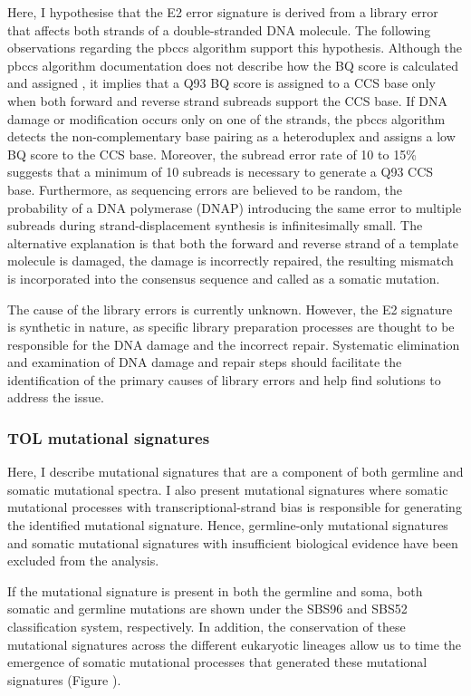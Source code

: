 Here, I hypothesise that the E2 error signature is derived from a library error that affects both strands of a double-stranded DNA molecule. The following observations regarding the pbccs algorithm support this hypothesis. Although the pbccs algorithm documentation does not describe how the BQ score is calculated and assigned \cite{ccs2023}, it implies that a Q93 BQ score is assigned to a CCS base only when both forward and reverse strand subreads support the CCS base. If DNA damage or modification occurs only on one of the strands, the pbccs algorithm detects the non-complementary base pairing as a heteroduplex and assigns a low BQ score to the CCS base. Moreover, the subread error rate of 10 to 15\% \cite{Chaisson2012-vr} suggests that a minimum of 10 subreads is necessary to generate a Q93 CCS base. Furthermore, as sequencing errors are believed to be random, the probability of a DNA polymerase (DNAP) introducing the same error to multiple subreads during strand-displacement synthesis is infinitesimally small. The alternative explanation is that both the forward and reverse strand of a template molecule is damaged, the damage is incorrectly repaired, the resulting mismatch is incorporated into the consensus sequence and called as a somatic mutation. 

The cause of the library errors is currently unknown. However, the E2 signature is synthetic in nature, as specific library preparation processes are thought to be responsible for the DNA damage and the incorrect repair. Systematic elimination and examination of DNA damage and repair steps should facilitate the identification of the primary causes of library errors and help find solutions to address the issue. 

\subsubsection{TOL mutational signatures}

Here, I describe mutational signatures that are a component of both germline and somatic mutational spectra. I also present mutational signatures where somatic mutational processes with transcriptional-strand bias is responsible for generating the identified mutational signature. Hence, germline-only mutational signatures and somatic mutational signatures with insufficient biological evidence have been excluded from the analysis. 

If the mutational signature is present in both the germline and soma, both somatic and germline mutations are shown under the SBS96 and SBS52 classification system, respectively. In addition, the conservation of these mutational signatures across the different eukaryotic lineages allow us to time the emergence of somatic mutational processes that generated these mutational signatures (Figure ).

